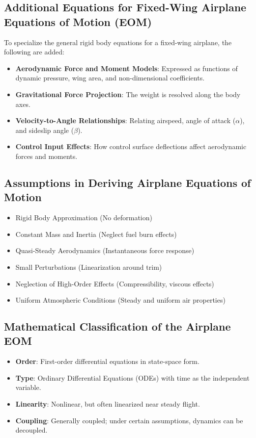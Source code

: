 \documentclass{article}
\begin{document}
\subsection{Additional Equations for Fixed-Wing Airplane Equations of Motion (EOM)}

To specialize the general rigid body equations for a fixed-wing airplane, the following are added:

\begin{itemize}
    \item \textbf{Aerodynamic Force and Moment Models}: Expressed as functions of dynamic pressure, wing area, and non-dimensional coefficients.
    \item \textbf{Gravitational Force Projection}: The weight is resolved along the body axes.
    \item \textbf{Velocity-to-Angle Relationships}: Relating airspeed, angle of attack (\(\alpha\)), and sideslip angle (\(\beta\)).
    \item \textbf{Control Input Effects}: How control surface deflections affect aerodynamic forces and moments.
\end{itemize}

\subsection{Assumptions in Deriving Airplane Equations of Motion}

\begin{itemize}
    \item Rigid Body Approximation (No deformation)
    \item Constant Mass and Inertia (Neglect fuel burn effects)
    \item Quasi-Steady Aerodynamics (Instantaneous force response)
    \item Small Perturbations (Linearization around trim)
    \item Neglection of High-Order Effects (Compressibility, viscous effects)
    \item Uniform Atmospheric Conditions (Steady and uniform air properties)
\end{itemize}

\subsection{Mathematical Classification of the Airplane EOM}

\begin{itemize}
    \item \textbf{Order}: First-order differential equations in state-space form.
    \item \textbf{Type}: Ordinary Differential Equations (ODEs) with time as the independent variable.
    \item \textbf{Linearity}: Nonlinear, but often linearized near steady flight.
    \item \textbf{Coupling}: Generally coupled; under certain assumptions, dynamics can be decoupled.
\end{itemize}
\end{document}

